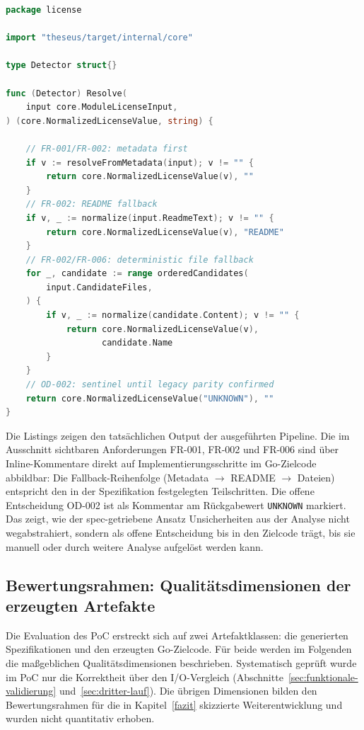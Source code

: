 \begin{lstlisting}[style=codestyle, language=Go, caption={Vom Builder erzeugter Go-Zielcode: license/detect.go}, label=lst:target]
package license

import "theseus/target/internal/core"

type Detector struct{}

func (Detector) Resolve(
    input core.ModuleLicenseInput,
) (core.NormalizedLicenseValue, string) {

    // FR-001/FR-002: metadata first
    if v := resolveFromMetadata(input); v != "" {
        return core.NormalizedLicenseValue(v), ""
    }
    // FR-002: README fallback
    if v, _ := normalize(input.ReadmeText); v != "" {
        return core.NormalizedLicenseValue(v), "README"
    }
    // FR-002/FR-006: deterministic file fallback
    for _, candidate := range orderedCandidates(
        input.CandidateFiles,
    ) {
        if v, _ := normalize(candidate.Content); v != "" {
            return core.NormalizedLicenseValue(v),
                   candidate.Name
        }
    }
    // OD-002: sentinel until legacy parity confirmed
    return core.NormalizedLicenseValue("UNKNOWN"), ""
}
\end{lstlisting}

Die Listings zeigen den tatsächlichen Output der ausgeführten Pipeline. Die im Ausschnitt sichtbaren Anforderungen FR-001, FR-002 und FR-006 sind über Inline-Kommentare direkt auf Implementierungsschritte im Go-Zielcode abbildbar: Die Fallback-Reihenfolge (Metadata $\to$ README $\to$ Dateien) entspricht den in der Spezifikation festgelegten Teilschritten. Die offene Entscheidung OD-002 ist als Kommentar am Rückgabewert \texttt{UNKNOWN} markiert. Das zeigt, wie der spec-getriebene Ansatz Unsicherheiten aus der Analyse nicht wegabstrahiert, sondern als offene Entscheidung bis in den Zielcode trägt, bis sie manuell oder durch weitere Analyse aufgelöst werden kann.

\subsection{Bewertungsrahmen: Qualitätsdimensionen der erzeugten Artefakte} \label{sec:bewertungsrahmen}

Die Evaluation des PoC erstreckt sich auf zwei Artefaktklassen: die generierten Spezifikationen und den erzeugten Go-Zielcode. Für beide werden im Folgenden die maßgeblichen Qualitätsdimensionen beschrieben. Systematisch geprüft wurde im PoC nur die Korrektheit über den I/O-Vergleich (Abschnitte~\ref{sec:funktionale-validierung} und~\ref{sec:dritter-lauf}). Die übrigen Dimensionen bilden den Bewertungsrahmen für die in Kapitel~\ref{fazit} skizzierte Weiterentwicklung und wurden nicht quantitativ erhoben.

